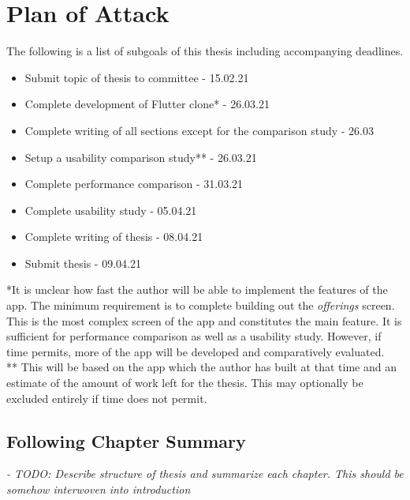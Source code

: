 \section{Plan of Attack}
\label{section:planofattack}
The following is a list of subgoals of this thesis including accompanying deadlines.

\begin{itemize}
    \item Submit topic of thesis to committee - 15.02.21
    \item Complete development of Flutter clone* - 26.03.21
    \item Complete writing of all sections except for the comparison study - 26.03
    \item Setup a usability comparison study** - 26.03.21
    \item Complete performance comparison - 31.03.21
    \item Complete usability study - 05.04.21
    \item Complete writing of thesis - 08.04.21
    \item Submit thesis - 09.04.21
    
\end{itemize}

*It is unclear how fast the author will be able to implement the features of the app. The minimum requirement is to complete building out the \textit{offerings} screen. This is the most complex screen of the app and constitutes the main feature. It is sufficient for performance comparison as well as a usability study. However, if time permits, more of the app will be developed and comparatively evaluated. \\

** This will be based on the app which the author has built at that time and an estimate of the amount of work left for the thesis. This may optionally be excluded entirely if time does not permit.

\subsection{Following Chapter Summary}
\textit{- TODO: Describe structure of thesis and summarize each chapter. 
This should be somehow interwoven into introduction}